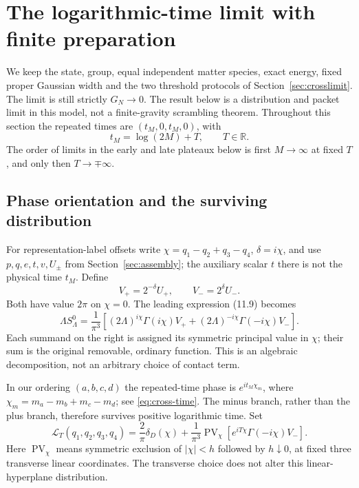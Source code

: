 \section{The logarithmic-time limit with finite preparation}
\label{sec:logtime}
We keep the state, group, equal independent matter species, exact energy,
fixed proper Gaussian width and the two threshold protocols of
Section~\ref{sec:crosslimit}. The limit is still strictly $G_N\to0$.
The result below is a distribution and packet limit in this model, not
a finite-gravity scrambling theorem. Throughout this section the repeated
times are $(t_M,0,t_M,0)$, with
\begin{equation}
 t_M=\log(2M)+T,\qquad T\in\mathbb R.
 \label{eq:logtime-scaling}
\end{equation}
The order of limits in the early and late plateaux below is first
$M\to\infty$ at fixed $T$, and only then $T\to\mp\infty$.

\subsection{Phase orientation and the surviving distribution}
For representation-label offsets write
$\chi=q_1-q_2+q_3-q_4$, $\delta=i\chi$, and use $p,q,e,t,v,U_\pm$
from Section~\ref{sec:assembly}; the auxiliary scalar $t$ there is not
the physical time $t_M$. Define
\begin{equation}
 V_+=2^{-\delta}U_+,\qquad V_-=2^{\delta}U_-.
 \label{eq:logtime-V}
\end{equation}
Both have value $2\pi$ on $\chi=0$. The leading expression (11.9) becomes
\begin{equation}
 \Lambda S^0_\Lambda=\frac{1}{\pi^3}
 \left[(2\Lambda)^{i\chi}\Gamma(i\chi)V_+
       +(2\Lambda)^{-i\chi}\Gamma(-i\chi)V_-\right].
 \label{eq:logtime-leading}
\end{equation}
Each summand on the right is assigned its symmetric principal value in
$\chi$; their sum is the original removable, ordinary function. This is
an algebraic decomposition, not an arbitrary choice of contact term.

In our ordering $(a,b,c,d)$ the repeated-time phase is
$e^{it_M\chi_m}$, where $\chi_m=m_a-m_b+m_c-m_d$; see
\eqref{eq:cross-time}. The minus branch, rather than the plus branch,
therefore survives positive logarithmic time. Set
\begin{equation}
 \mathcal L_T(q_1,q_2,q_3,q_4)
 =\frac{2}{\pi}\delta_D(\chi)
 +\frac{1}{\pi^3}\operatorname{PV}_{\chi}
      \left[e^{iT\chi}\Gamma(-i\chi)V_-\right].
 \label{eq:logtime-local-distribution}
\end{equation}
Here $\operatorname{PV}_\chi$ means symmetric exclusion of $|\chi|<h$
followed by $h\downarrow0$, at fixed three transverse linear coordinates.
The transverse choice does not alter this linear-hyperplane distribution.

